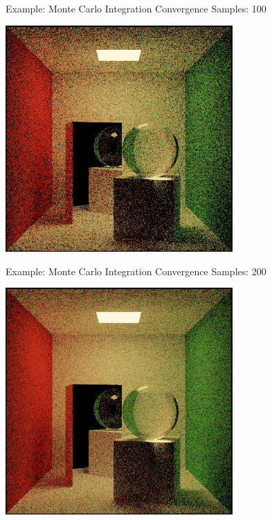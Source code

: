 \documentclass{beamer}
\begin{document}
\begin{frame}{Example: Monte Carlo Integration Convergence}
    Samples: 100
    \begin{center}
        \includegraphics[width=0.65\textwidth]{../img/convergence/cornell-00100.png}
    \end{center}
\end{frame}

\begin{frame}{Example: Monte Carlo Integration Convergence}
    Samples: 200
    \begin{center}
        \includegraphics[width=0.65\textwidth]{../img/convergence/cornell-00200.png}
    \end{center}
\end{frame}
\end{document}
